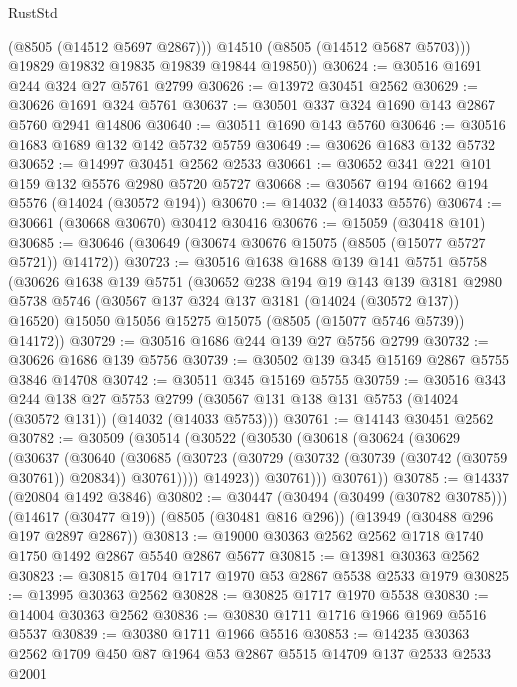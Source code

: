 \begin{lexlean}{RustStd}
\begin{coremodule}
            (@8505 (@14512 @5697 @2867)))
          @14510
          (@8505 (@14512 @5687 @5703)))
        @19829
        @19832
        @19835
        @19839
        @19844
        @19850))
@30624 := @30516 @1691 @244 @324 @27 @5761 @2799
@30626 := @13972 @30451 @2562
@30629 := @30626 @1691 @324 @5761
@30637 := @30501 @337 @324 @1690 @143 @2867 @5760 @2941 @14806
@30640 := @30511 @1690 @143 @5760
@30646 := @30516 @1683 @1689 @132 @142 @5732 @5759
@30649 := @30626 @1683 @132 @5732
@30652 := @14997 @30451 @2562 @2533
@30661 := @30652 @341 @221 @101 @159 @132 @5576 @2980 @5720 @5727
@30668 := @30567 @194 @1662 @194 @5576 (@14024 (@30572 @194))
@30670 := @14032 (@14033 @5576)
@30674 := @30661 (@30668 @30670) @30412 @30416
@30676 := @15059 (@30418 @101)
@30685 := @30646 (@30649 (@30674 @30676 @15075 (@8505 (@15077 @5727 @5721)) @14172))
@30723 := @30516
    @1638
    @1688
    @139
    @141
    @5751
    @5758
    (@30626
      @1638
      @139
      @5751
      (@30652
        @238
        @194
        @19
        @143
        @139
        @3181
        @2980
        @5738
        @5746
        (@30567 @137 @324 @137 @3181 (@14024 (@30572 @137)) @16520)
        @15050
        @15056
        @15275
        @15075
        (@8505 (@15077 @5746 @5739))
        @14172))
@30729 := @30516 @1686 @244 @139 @27 @5756 @2799
@30732 := @30626 @1686 @139 @5756
@30739 := @30502 @139 @345 @15169 @2867 @5755 @3846 @14708
@30742 := @30511 @345 @15169 @5755
@30759 := @30516
    @343
    @244
    @138
    @27
    @5753
    @2799
    (@30567 @131 @138 @131 @5753 (@14024 (@30572 @131)) (@14032 (@14033 @5753)))
@30761 := @14143 @30451 @2562
@30782 := @30509
    (@30514
      (@30522
        (@30530
          (@30618
            (@30624
              (@30629
                (@30637
                  (@30640
                    (@30685
                      (@30723 (@30729 (@30732 (@30739 (@30742 (@30759 @30761)) @20834)) @30761))))
                  @14923))
              @30761)))
        @30761))
@30785 := @14337 (@20804 @1492 @3846)
@30802 := @30447
    (@30494 (@30499 (@30782 @30785)))
    (@14617 (@30477 @19))
    (@8505 (@30481 @816 @296))
    (@13949 (@30488 @296 @197 @2897 @2867))
@30813 := @19000 @30363 @2562 @2562 @1718 @1740 @1750 @1492 @2867 @5540 @2867 @5677
@30815 := @13981 @30363 @2562
@30823 := @30815 @1704 @1717 @1970 @53 @2867 @5538 @2533 @1979
@30825 := @13995 @30363 @2562
@30828 := @30825 @1717 @1970 @5538
@30830 := @14004 @30363 @2562
@30836 := @30830 @1711 @1716 @1966 @1969 @5516 @5537
@30839 := @30380 @1711 @1966 @5516
@30853 := @14235 @30363 @2562 @1709 @450 @87 @1964 @53 @2867 @5515 @14709 @137 @2533 @2533 @2001

\end{coremodule}
\end{lexlean}
